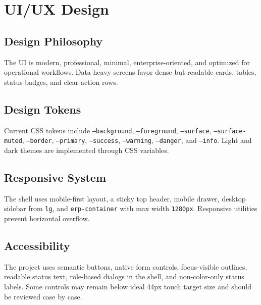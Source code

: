 \chapter{UI/UX Design}
\section{Design Philosophy}
The UI is modern, professional, minimal, enterprise-oriented, and optimized for operational workflows. Data-heavy screens favor dense but readable cards, tables, status badges, and clear action rows.

\section{Design Tokens}
Current CSS tokens include \texttt{--background}, \texttt{--foreground}, \texttt{--surface}, \texttt{--surface-muted}, \texttt{--border}, \texttt{--primary}, \texttt{--success}, \texttt{--warning}, \texttt{--danger}, and \texttt{--info}. Light and dark themes are implemented through CSS variables.

\section{Responsive System}
The shell uses mobile-first layout, a sticky top header, mobile drawer, desktop sidebar from \texttt{lg}, and \texttt{erp-container} with max width \texttt{1280px}. Responsive utilities prevent horizontal overflow.

\section{Accessibility}
The project uses semantic buttons, native form controls, focus-visible outlines, readable status text, role-based dialogs in the shell, and non-color-only status labels. Some controls may remain below ideal 44px touch target size and should be reviewed case by case.
